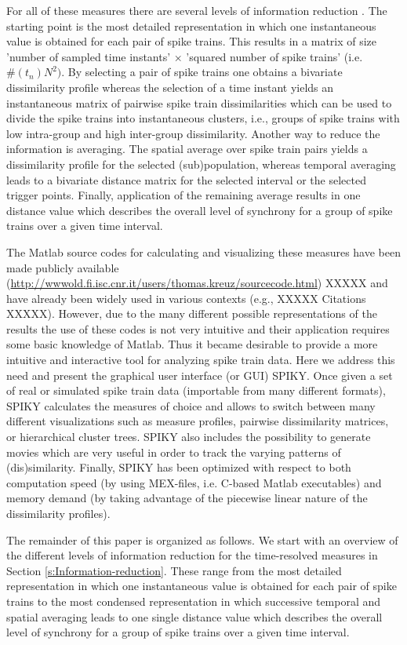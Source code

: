 \documentclass[10pt,twocolumn]{elsart5p}
\begin{document}
For all of these measures there are several levels of information reduction \citep{Kreuz12}. The starting point is the most detailed representation in which one instantaneous value is obtained for each pair of spike trains. This results in a matrix of size ’number of sampled time instants’ × ’squared number of spike trains’ (i.e. $\#(t_n)N^2)$. By selecting a pair of spike trains one obtains a bivariate dissimilarity profile whereas the selection of a time instant yields an instantaneous matrix of pairwise spike train dissimilarities which can be used to divide the spike trains into instantaneous clusters, i.e., groups of spike trains with low intra-group and high inter-group dissimilarity. Another way to reduce the information is averaging. The spatial average over spike train pairs yields a dissimilarity profile for the selected (sub)population, whereas temporal averaging leads to a bivariate distance matrix for the selected interval or the selected trigger points. Finally, application of the remaining average results in one distance value which describes the overall level of synchrony for a group of spike trains over a given time interval.

The Matlab source codes for calculating and visualizing these measures have been made publicly available (\url{http://wwwold.fi.isc.cnr.it/users/thomas.kreuz/sourcecode.html}) XXXXX and have already been widely used in various contexts (e.g., XXXXX Citations XXXXX). However, due to the many different possible representations of the results the use of these codes is not very intuitive and their application requires some basic knowledge of Matlab. Thus it became desirable to provide a more intuitive and interactive tool for analyzing spike train data. Here we address this need and present the graphical user interface (or GUI) SPIKY. Once given a set of real or simulated spike train data (importable from many different formats), SPIKY calculates the measures of choice and allows to switch between many different visualizations such as measure profiles, pairwise dissimilarity matrices, or hierarchical cluster trees. SPIKY also includes the possibility to generate movies which are very useful in order to track the varying patterns of (dis)similarity. Finally, SPIKY has been optimized with respect to both computation speed (by using MEX-files, i.e. C-based Matlab executables) and memory demand (by taking advantage of the piecewise linear nature of the dissimilarity profiles).

The remainder of this paper is organized as follows. We start with an overview of the different levels of information reduction for the time-resolved measures in Section \ref{s:Information-reduction}. These range from the most detailed representation in which one instantaneous value is obtained for each pair of spike trains to the most condensed representation in which successive temporal and spatial averaging leads to one single distance value which describes the overall level of synchrony for a group of spike trains over a given time interval.
\end{document}

